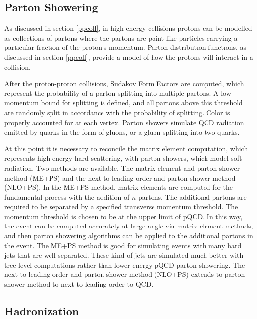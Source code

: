 \documentclass[oneside, letterpaper, oldfontcommands]{memoir}
\begin{document}
\subsection{Parton Showering}\label{partonshower}
\qquad As discussed in section \ref{ppcoll}, in high energy collisions protons can be modelled as collections of partons where the partons are point like particles carrying a particular fraction of the proton's momentum. Parton distribution functions, as discussed in section \ref{ppcoll}, provide a model of how the protons will interact in a collision. 

\qquad After the proton-proton collisions, Sudakov Form Factors\cite{Agashe:2014kda} are computed, which represent the probability of a parton splitting into multiple partons. A low momentum bound for splitting is defined, and all partons above this threshold are randomly split in accordance with the probability of splitting. Color is properly accounted for at each vertex. Parton showers simulate QCD radiation emitted by quarks in the form of gluons, or a gluon splitting into two quarks.

\qquad At this point it is necessary to reconcile the matrix element computation, which represents high energy hard scattering, with parton showers, which model soft radiation. Two methods are available. The matrix element and parton shower method (ME+PS) and the next to leading order and parton shower method (NLO+PS)\cite{Agashe:2014kda}. In the ME+PS method, matrix elements are computed for the fundamental process with the addition of $n$ partons. The additional partons are required to be separated by a specified transverse momentum threshold. The momentum threshold is chosen to be at the upper limit of pQCD. In this way, the event can be computed accurately at large angle via matrix element methods, and then parton showering algorithms can be applied to the additional partons in the event. The ME+PS method is good for simulating events with many hard jets that are well separated. These kind of jets are simulated much better with tree level computations rather than lower energy pQCD parton showering. The next to leading order and parton shower method (NLO+PS) extends to parton shower method to next to leading order to QCD. 

\subsection{Hadronization}\label{hadronization}
 
\end{document}
